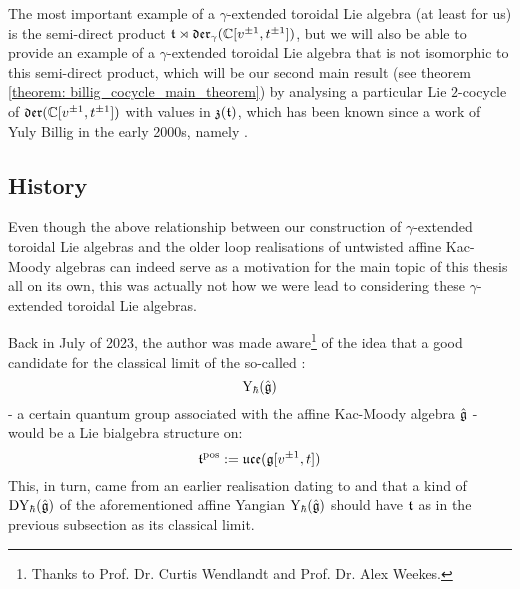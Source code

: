         The most important example of a $\gamma$-extended toroidal Lie algebra (at least for us) is the semi-direct product $\mathfrak{t} \rtimes \mathfrak{der}_{\gamma}(\mathbb{C}[v^{\pm 1}, t^{\pm 1}])$, but we will also be able to provide an example of a $\gamma$-extended toroidal Lie algebra that is not isomorphic to this semi-direct product, which will be our second main result (see theorem \ref{theorem: billig_cocycle_main_theorem}) by analysing a particular Lie $2$-cocycle of $\mathfrak{der}(\mathbb{C}[v^{\pm 1}, t^{\pm 1}])$ with values in $\mathfrak{z}(\mathfrak{t})$, which has been known since a work of Yuly Billig in the early 2000s, namely \cite{billig_energy_momentum_tensor}. 

    \subsection{History}
        Even though the above relationship between our construction of $\gamma$-extended toroidal Lie algebras and the older loop realisations of untwisted affine Kac-Moody algebras can indeed serve as a motivation for the main topic of this thesis all on its own, this was actually not how we were lead to considering these $\gamma$-extended toroidal Lie algebras.

        Back in July of 2023, the author was made aware\footnote{Thanks to Prof. Dr. Curtis Wendlandt and Prof. Dr. Alex Weekes.} of the idea that a good candidate for the classical limit of the so-called :
            $$\mathrm{Y}_{\hbar}(\hat{\mathfrak{g}})$$
        - a certain quantum group associated with the affine Kac-Moody algebra $\hat{\mathfrak{g}}$ - would be a Lie bialgebra structure on:
            $$\mathfrak{t}^{\mathrm{pos}} := \mathfrak{uce}(\mathfrak{g}[v^{\pm 1}, t])$$
        This, in turn, came from an earlier realisation dating to \cite{wendlandt_formal_shift_operators_on_yangian_doubles} and \cite{guay_nakajima_wendlandt_affine_yangian_vertex_representations_and_PBW} that a kind of  $\mathrm{D}\mathrm{Y}_{\hbar}(\hat{\mathfrak{g}})$ of the aforementioned affine Yangian $\mathrm{Y}_{\hbar}(\hat{\mathfrak{g}})$ should have $\mathfrak{t}$ as in the previous subsection as its classical limit. 
        
